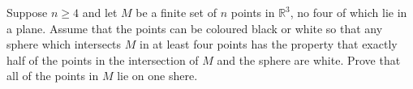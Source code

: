\documentclass{article}
\begin{document}
\setlength{\parindent}{0pt}
Suppose $n\ge4$ and let $M$ be a finite set of $n$ points in $\mathbb{R}^{3}$, no four of which lie in a plane. Assume that the points can be coloured black or white so that any sphere which intersects $M$ in at least four points has the property that exactly half of the points in the intersection of $M$ and the sphere are white. Prove that all of the points in $M$ lie on one shere.
\end{document}
